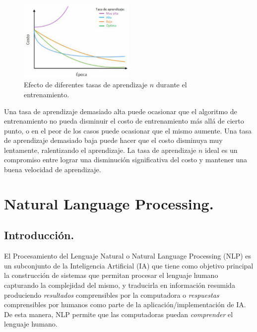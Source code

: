 \documentclass[12pt,a4paper]{article}
\begin{document}
\begin{sloppypar}
\begin{figure}[H]    %
 \centering
 \includegraphics[width=0.5\textwidth]{images/ANN/6-ANN.png}
  \captionsetup{justification=centering,margin=3cm}
 \caption{Efecto de diferentes tasas de aprendizaje $n$ durante el entrenamiento\cite{ANN_25}.} 
 \label{fig:ann_6}
\end{figure}

Una tasa de aprendizaje demasiado alta puede ocasionar que el algoritmo de entrenamiento no pueda disminuir el costo de entrenamiento más allá de cierto punto, o en el peor de los casos puede ocasionar que el mismo aumente. Una tasa de aprendizaje demasiado baja puede hacer que el costo disminuya muy lentamente, ralentizando el aprendizaje. La tasa de aprendizaje $n$ ideal es un compromiso entre lograr una disminución significativa del costo y mantener una buena velocidad de aprendizaje\cite{ANN_25}.
\cleardoublepage

\section{Natural Language Processing.}\label{4.NaturalLanguageProcessing}

\subsection{Introducción.}\label{Intro_NLP}

El Procesamiento del Lenguaje Natural o Natural Language Processing (NLP) es un subconjunto de la Inteligencia Artificial (IA) que tiene como objetivo principal la construcción de sistemas que permitan procesar el lenguaje humano capturando la complejidad del mismo, y traducirla en información resumida produciendo \textit{resultados} comprensibles por la computadora o \textit{respuestas} comprensibles por humanos como parte de la aplicación/implementación de IA. De esta manera, NLP permite que las computadoras puedan \textit{comprender} el lenguaje humano.


\end{sloppypar}
\end{document}
